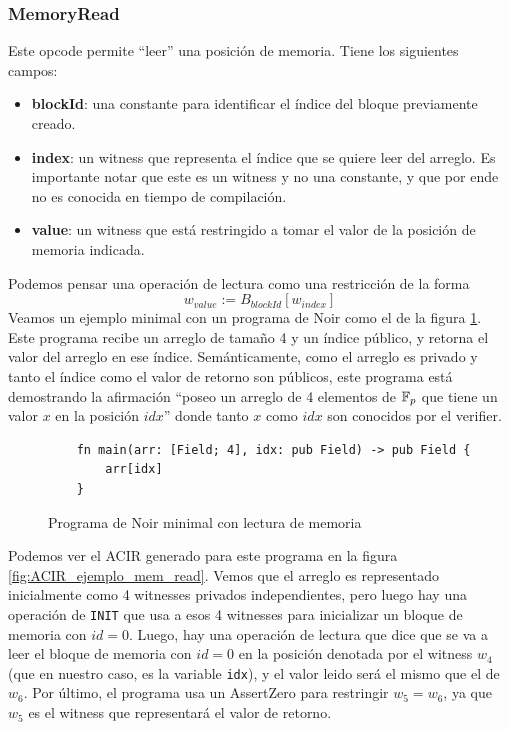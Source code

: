 \subsubsection{\textbf{MemoryRead}}
Este opcode permite “leer'' una posición de memoria. Tiene los siguientes campos:
\begin{itemize}
    \item \textbf{blockId}: una constante para identificar el índice del bloque previamente creado.
    \item \textbf{index}: un witness que representa el índice que se quiere leer del arreglo. Es importante notar que este es un witness y no una constante, y que por ende no es conocida en tiempo de compilación.
    \item \textbf{value}: un witness que está restringido a tomar el valor de la posición de memoria indicada. 
\end{itemize}
Podemos pensar una operación de lectura como una restricción de la forma
$$w_{value} := B_{blockId}[w_{index}]$$ 
Veamos un ejemplo minimal con un programa de Noir como el de la figura \ref{fig:noir_ejemplo_mem_read}. Este programa recibe un arreglo de tamaño 4 y un índice público, y retorna el valor del arreglo en ese índice. Semánticamente, como el arreglo es privado y tanto el índice como el valor de retorno son públicos, este programa está demostrando la afirmación “poseo un arreglo de 4 elementos de $\mathbb{F}_p$ que tiene un valor $x$ en la posición $idx$'' donde tanto $x$ como $idx$ son conocidos por el verifier. 

\begin{figure} 
\centering
\begin{minipage}{\textwidth}
\begin{verbatim}
    fn main(arr: [Field; 4], idx: pub Field) -> pub Field {
        arr[idx]
    }
\end{verbatim}
\end{minipage}
\caption{Programa de Noir minimal con lectura de memoria}
\label{fig:noir_ejemplo_mem_read}
\end{figure}

Podemos ver el ACIR generado para este programa en la figura \ref{fig:ACIR_ejemplo_mem_read}. Vemos que el arreglo es representado inicialmente como 4 witnesses privados independientes, pero luego hay una operación de \texttt{INIT} que usa a esos 4 witnesses para inicializar un bloque de memoria con $id=0$. Luego, hay una operación de lectura que dice que se va a leer el bloque de memoria con $id=0$ en la posición denotada por el witness $w_4$ (que en nuestro caso, es la variable \texttt{idx}), y el valor leido será el mismo que el de $w_6$. Por último, el programa usa un AssertZero para restringir $w_5 = w_6$, ya que $w_5$ es el witness que representará el valor de retorno. 

